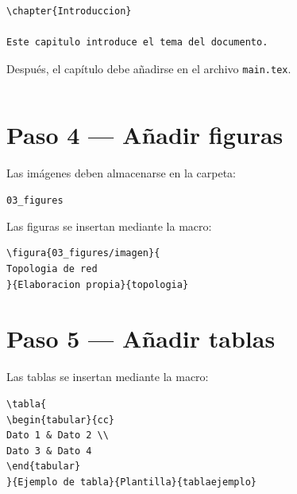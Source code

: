 \begin{lstlisting}[caption={Crear un capítulo},label={code:createchapter}]
\chapter{Introduccion}

Este capitulo introduce el tema del documento.
\end{lstlisting}




Después, el capítulo debe añadirse en el archivo
\texttt{main.tex}.

\begin{lstlisting}[caption={Cargar capítulo},label={code:loadchapter}]

\end{lstlisting}





\section{Paso 4 — Añadir figuras}

Las imágenes deben almacenarse en la carpeta:

\texttt{03\_figures}



Las figuras se insertan mediante la macro:

\begin{lstlisting}[caption={Insertar figura},label={code:insertfigure}]
\figura{03_figures/imagen}{
Topologia de red
}{Elaboracion propia}{topologia}
\end{lstlisting}





\section{Paso 5 — Añadir tablas}

Las tablas se insertan mediante la macro:

\begin{lstlisting}[caption={Insertar tabla},label={code:table}]
\tabla{
\begin{tabular}{cc}
Dato 1 & Dato 2 \\
Dato 3 & Dato 4
\end{tabular}
}{Ejemplo de tabla}{Plantilla}{tablaejemplo}
\end{lstlisting}

